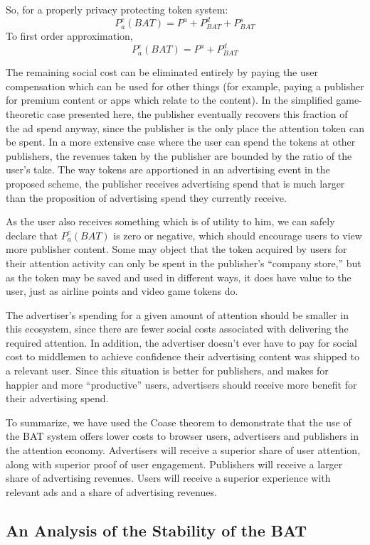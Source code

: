 \documentclass[11pt]{article}
\begin{document}
So, for a properly privacy protecting token system: 
  \[P^{c}_a(BAT) = P^{a} + P^{d}_{BAT} + P^{s}_{BAT}\]
  To first order approximation,  
  \[P^{c}_a(BAT) = P^{a} + P^{d}_{BAT} \]

The remaining social cost can be eliminated entirely by paying the
user compensation which can be used for other things (for example,
paying a publisher for premium content or apps which relate to the
content). In the simplified game-theoretic case presented here, the
publisher eventually recovers this fraction of the ad spend anyway,
since the publisher is the only place the attention token can be
spent. In a more extensive case where the user can spend the tokens at
other publishers, the revenues taken by the publisher are bounded by
the ratio of the user's take. The way tokens are apportioned in an
advertising event in the proposed scheme, the publisher receives
advertising spend that is much larger than the proposition of
advertising spend they currently receive.

As the user also receives something which is of utility to him, we can
safely declare that $P^{c}_a(BAT)$ is zero or negative, which should encourage users
to view more publisher content. Some may object that the token
acquired by users for their attention activity can only be spent in
the publisher's ``company store,'' but as the token may be saved and
used in different ways, it does have value to the user, just as
airline points and video game tokens do.

The advertiser's spending for a given amount of attention should be
smaller in this ecosystem, since there are fewer social costs
associated with delivering the required attention. In addition, the
advertiser doesn't ever have to pay for social cost to middlemen to
achieve confidence their advertising content was shipped to a relevant
user. Since this situation is better for publishers, and makes for
happier and more ``productive'' users, advertisers should receive more
benefit for their advertising spend.

To summarize, we have used the Coase theorem to demonstrate that the
use of the BAT system offers lower costs to browser users, advertisers
and publishers in the attention economy. Advertisers will receive a
superior share of user attention, along with superior proof of user
engagement. Publishers will receive a larger share of advertising
revenues. Users will receive a superior experience with relevant ads
and a share of advertising revenues.


\subsection{An Analysis of the Stability of the BAT}
\label{sec-8-3}
\end{document}
